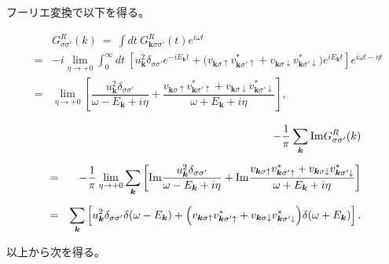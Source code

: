 \documentclass[uplatex,a4j,12pt,dvipdfmx]{jsarticle}
\begin{document}
フーリエ変換で以下を得る。

\begin{eqnarray}
	&&
	G^{R}_{\sigma \sigma'}(k)
	\ = \
	\int \! dt \
	G^{R}_{\bm{k} \sigma \sigma'}(t)
	e^{i \omega t}
	\nonumber \\[4mm] &=&
	-
	i
	\lim_{\eta \to +0}
	\int^{\infty}_{0} \!\! dt \
	\left[
		u_{\bm{k}}^{2}
		\delta_{\sigma \sigma'}
		e^{ - i E_{\bm{k}} t }
		+
		\Big(
		v_{\bm{k} \sigma \uparrow}
		v_{\bm{k} \sigma' \uparrow}^{*}
		+
		v_{\bm{k} \sigma \downarrow}
		v_{\bm{k} \sigma' \downarrow}^{*}
		\Big)
		e^{ i E_{\bm{k}} t }
		\right]
	e^{i \omega t - \eta t}
	\nonumber \\[4mm] &=&
	\lim_{\eta \to +0}
	\left[
		\dfrac{
			u_{\bm{k}}^{2}
			\delta_{\sigma \sigma'}
		}{ \omega - E_{\bm{k}} + i \eta }
		+
		\dfrac{
			v_{\bm{k} \sigma \uparrow}
			v_{\bm{k} \sigma' \uparrow}^{*}
			+
			v_{\bm{k} \sigma \downarrow}
			v_{\bm{k} \sigma' \downarrow}^{*}
		}{ \omega + E_{\bm{k}} + i \eta }
		\right]
	,
\end{eqnarray}

\begin{eqnarray}
	&&
	- \dfrac{ 1 }{ \pi }
	\sum_{\bm{k}}
	{\rm Im} G^{R}_{\sigma \sigma'}(k)
	\nonumber \\[2mm] &=&
	-
	\dfrac{1}{\pi}
	\lim_{\eta \to +0}
	\sum_{\bm{k}}
	\left[
	{\rm Im}
	\dfrac{
		u_{\bm{k}}^{2}
		\delta_{\sigma \sigma'}
	}{ \omega - E_{\bm{k}} + i \eta }
	+
	{\rm Im}
	\dfrac{
		v_{\bm{k} \sigma \uparrow}
		v_{\bm{k} \sigma' \uparrow}^{*}
		+
		v_{\bm{k} \sigma \downarrow}
		v_{\bm{k} \sigma' \downarrow}^{*}
	}{ \omega + E_{\bm{k}} + i \eta }
	\right]
	\nonumber \\[2mm] &=&
	\sum_{\bm{k}}
	\left[
		u_{\bm{k}}^{2}
		\delta_{\sigma \sigma'}
		\delta( \omega - E_{\bm{k}} )
		+
		\Big(
		v_{\bm{k} \sigma \uparrow}
		v_{\bm{k} \sigma' \uparrow}^{*}
		+
		v_{\bm{k} \sigma \downarrow}
		v_{\bm{k} \sigma' \downarrow}^{*}
		\Big)
		\delta( \omega + E_{\bm{k}} )
		\right]
	.
\end{eqnarray}


以上から次を得る。
\end{document}
